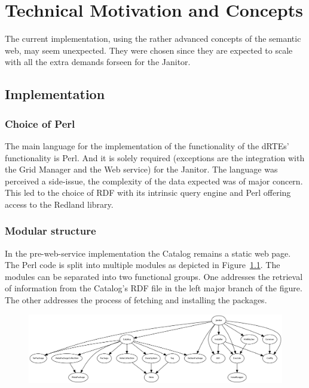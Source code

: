 \chapter{Technical Motivation and Concepts}

The current implementation, using the rather advanced concepts of the
semantic web, may seem unexpected. They were chosen since they are expected
to scale with all the extra demands forseen for the Janitor.

\section{Implementation}

\subsection{Choice of Perl}

The main language for the implementation of the functionality of the
dRTEs' functionality is Perl. And it is solely required (exceptions
are the integration with the Grid Manager and the Web service) for the
Janitor.
The language was perceived a side-issue, the complexity of the data
expected was of major concern. This led to the choice of RDF with its
intrinsic query engine and Perl offering access to the Redland library.

\subsection{Modular structure}

In the pre-web-service implementation the Catalog remains a static
web page. The Perl code is split into multiple modules as depicted
in Figure~\ref{fig:janitorDependencies}.  The modules can be separated
into two functional groups. One addresses the retrieval of information
from the Catalog's RDF file in the left major branch of the figure. The
other addresses the process of fetching and installing the packages.

\begin{landscape}
 \begin{figure}[!h]
 \vspace{4cm}
 \begin{center} 
 \includegraphics[width=24cm]{images/dependencies.png}
 \end{center} 
 \vfill
 \label{fig:janitorDependencies} 
 \end{figure}
\end{landscape}

